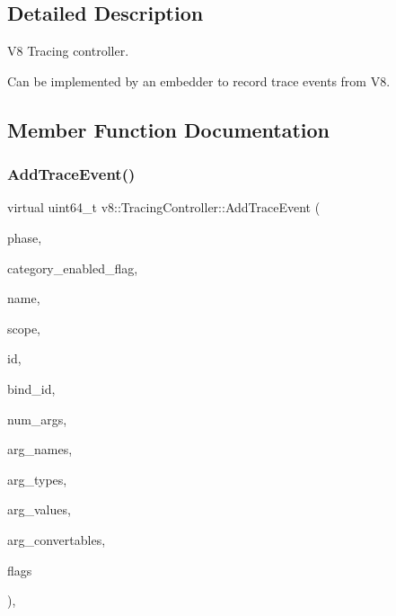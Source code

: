 \subsection{Detailed Description}
V8 Tracing controller.

Can be implemented by an embedder to record trace events from V8. 

\subsection{Member Function Documentation}
\mbox{\label{classv8_1_1TracingController_ad1e234b340ea8f9f1e3386aa21dad5dd}} 
\subsubsection{\texorpdfstring{Add\+Trace\+Event()}{AddTraceEvent()}}
{\footnotesize\ttfamily virtual uint64\+\_\+t v8\+::\+Tracing\+Controller\+::\+Add\+Trace\+Event (\begin{DoxyParamCaption}\item[{char}]{phase,  }\item[{const uint8\+\_\+t $\ast$}]{category\+\_\+enabled\+\_\+flag,  }\item[{const char $\ast$}]{name,  }\item[{const char $\ast$}]{scope,  }\item[{uint64\+\_\+t}]{id,  }\item[{uint64\+\_\+t}]{bind\+\_\+id,  }\item[{int32\+\_\+t}]{num\+\_\+args,  }\item[{const char $\ast$$\ast$}]{arg\+\_\+names,  }\item[{const uint8\+\_\+t $\ast$}]{arg\+\_\+types,  }\item[{const uint64\+\_\+t $\ast$}]{arg\+\_\+values,  }\item[{std\+::unique\+\_\+ptr$<$ \mbox{\hyperlink{classv8_1_1ConvertableToTraceFormat}{Convertable\+To\+Trace\+Format}} $>$ $\ast$}]{arg\+\_\+convertables,  }\item[{unsigned int}]{flags }\end{DoxyParamCaption})\hspace{0.3cm}{\ttfamily [inline]}, {\ttfamily [virtual]}}

